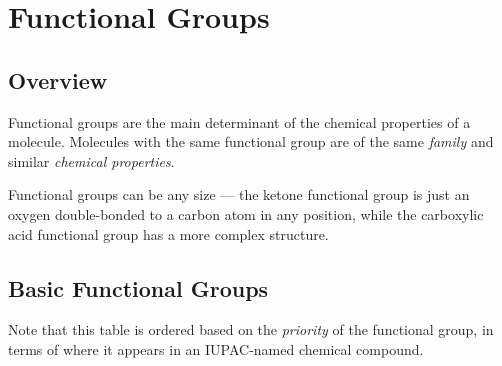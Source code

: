 


\pagebreak
\section{Functional Groups}
\subsection{Overview}

Functional groups are the main determinant of the chemical properties of a molecule. Molecules with the
same functional group are of the same \textit{family} and similar \textit{chemical properties}.

Functional groups can be any size –– the ketone functional group is just an oxygen double-bonded to a carbon atom
in any position, while the carboxylic acid functional group has a more complex structure.


\subsection{Basic Functional Groups}

Note that this table is ordered based on the \textit{priority} of the functional group, in terms of where it appears in
an IUPAC-named chemical compound.


